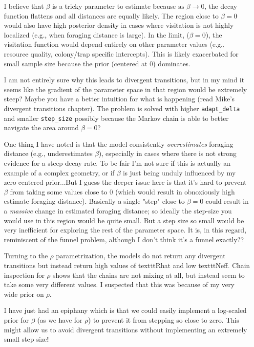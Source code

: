 \documentclass[12pt]{article}
\begin{document}
I believe that $\beta$ is a tricky parameter to estimate because $\text{as } \beta \to 0$, the decay function flattens and all distances are equally likely. The region close to $\beta = 0$ would also have high posterior density in cases where visitation is not highly localized (e.g., when foraging distance is large). In the limit, ($\beta = 0$), the visitation function would depend entirely on other parameter values (e.g., resource quality, colony/trap specific intercepts). This is likely exacerbated for small sample size because the prior (centered at 0) dominates.

I am not entirely sure why this leads to divergent transitions, but in my mind it seems like the gradient of the parameter space in that region would be extremely steep? Maybe you have a better intuition for what is happening (read Mike's divergent transitions chapter). The problem is solved with higher \texttt{adapt_delta} and smaller \texttt{step_size} possibly because the Markov chain is able to better navigate the area around $\beta = 0$?

One thing I have noted is that the model consistently \textit{overestimates} foraging distance (e.g., underestimates $\beta$), especially in cases where there is not strong evidence for a steep decay rate. To be fair I'm not sure if this is actually an example of a complex geometry, or if $\beta$ is just being unduly influenced by my zero-centered prior...But I guess the deeper issue here is that it's hard to prevent $\beta$ from taking some values close to 0 (which would result in obnoxiously high estimate foraging distance). Basically a single "step" close to $\beta = 0$ could result in a \textit{massive} change in estimated foraging distance; so ideally the step-size you would use in this region would be quite small. But a step size so small would be very inefficient for exploring the rest of the parameter space. It is, in this regard, reminiscent of the funnel problem, although I don't think it's a funnel exactly??


Turning to the $\rho$ parametrization, the models do not return any divergent transitions but instead return high values of texttt{Rhat} and low texttt{Neff}. Chain inspection for $\rho$ shows that the chains are not mixing at all, but instead seem to take some very different values. I suspected that this was because of my very wide prior on $\rho$.

I have just had an epiphany which is that we could easily implement a log-scaled prior for $\beta$ (as we have for $\rho$) to prevent it from stepping so close to zero. This might allow us to avoid divergent transitions without implementing an extremely small step size!

\clearpage
\end{document}

